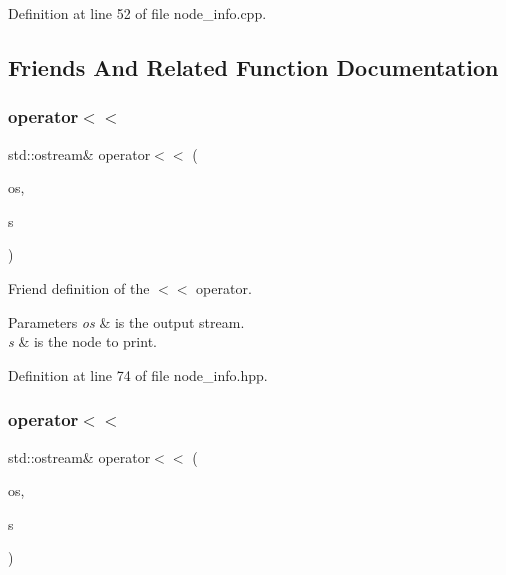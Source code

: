 Definition at line 52 of file node\+\_\+info.\+cpp.



\subsection{Friends And Related Function Documentation}
\mbox{\label{structNodeInfo_a4da12b8cecabbd10bf8e23b935adfc0b}} 
\subsubsection{\texorpdfstring{operator$<$$<$}{operator<<}\hspace{0.1cm}{\footnotesize\ttfamily [1/2]}}
{\footnotesize\ttfamily std\+::ostream\& operator$<$$<$ (\begin{DoxyParamCaption}\item[{std\+::ostream \&}]{os,  }\item[{const \hyperlink{structNodeInfo}{Node\+Info} \&}]{s }\end{DoxyParamCaption})\hspace{0.3cm}{\ttfamily [friend]}}



Friend definition of the $<$$<$ operator. 


\begin{DoxyParams}{Parameters}
{\em os} & is the output stream. \\
\hline
{\em s} & is the node to print. \\
\hline
\end{DoxyParams}


Definition at line 74 of file node\+\_\+info.\+hpp.

\mbox{\label{structNodeInfo_ac7d764c3c02da98c48d2395ceca5f5e6}} 
\subsubsection{\texorpdfstring{operator$<$$<$}{operator<<}\hspace{0.1cm}{\footnotesize\ttfamily [2/2]}}
{\footnotesize\ttfamily std\+::ostream\& operator$<$$<$ (\begin{DoxyParamCaption}\item[{std\+::ostream \&}]{os,  }\item[{const \hyperlink{node__info_8hpp_a345f052eed4efe04f7848fd0ebd015b2}{Node\+Info\+Ref} \&}]{s }\end{DoxyParamCaption})\hspace{0.3cm}{\ttfamily [friend]}}



